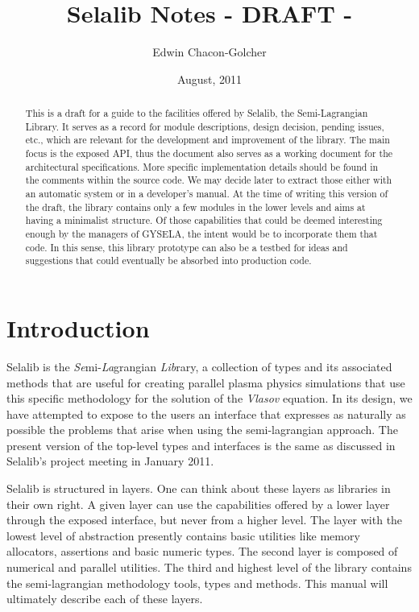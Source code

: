 \documentclass[]{report}   %
\begin{document}
\title{Selalib Notes - DRAFT -}   
\author{Edwin Chacon-Golcher}        
\date{August, 2011}    
\maketitle

\begin{abstract}
 This is a draft for a guide to the facilities offered by Selalib, the Semi-Lagrangian Library. It serves as a record for module descriptions, design decision, pending issues, etc., which are relevant for the development and improvement of the library. The main focus is the exposed API, thus the document also serves as a working document for the architectural specifications. More specific implementation details should be found in the comments within the source code. We may decide later to extract those either with an automatic system or in a developer's manual. At the time of writing this version of the draft, the library contains only a few modules in the lower levels and aims at having a minimalist structure. Of those capabilities that could be deemed interesting enough by the managers of GYSELA, the intent would be to incorporate them that code. In this sense, this library prototype can also be a testbed for ideas and suggestions that could eventually be absorbed into production code.


\end{abstract}


\tableofcontents

\chapter{Introduction}             %
Selalib is the \emph{Se}mi-\emph{La}grangian \emph{Lib}rary, a collection of types and its associated methods that are useful for creating parallel plasma physics simulations that use this specific methodology for the solution of the \emph{Vlasov} equation. In its design, we have attempted to expose to the users an interface that expresses as naturally as possible the problems that arise when using the semi-lagrangian approach. The present version of the top-level types and interfaces is the same as discussed in Selalib's project meeting in January 2011. 

Selalib is structured in layers. One can think about these layers as libraries in their own right. A given layer can use the capabilities offered by a lower layer through the exposed interface, but never from a higher level. The layer with the lowest level of abstraction presently contains basic utilities like memory allocators, assertions and basic numeric types. The second layer is composed of numerical and parallel utilities. The third and highest level of the library contains the semi-lagrangian methodology tools, types and methods. This manual will ultimately describe each of these layers.
\end{document}
